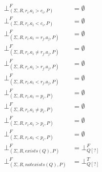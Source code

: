 \begin{mydef}
\begin{align*}
		\bot^F_{(\Sigma,R,r_i.a_i > c_i,P)} & =\emptyset \\
		\bot^F_{(\Sigma,R,r_i.a_i < c_i,P)} & =\emptyset \\
		\bot^F_{(\Sigma,R,r_i.a_i = r_j.a_j,P)} & = \emptyset \\
		\bot^F_{(\Sigma,R,r_i.a_i \neq r_j.a_j,P)} & = \emptyset \\
		\bot^F_{(\Sigma,R,r_i.a_i > r_j.a_j,P)} & = \emptyset \\
		\bot^F_{(\Sigma,R,r_i.a_i < r_j.a_j,P)} & = \emptyset \\
		\bot^F_{(\Sigma,R,r_i.a_i = p_i,P)} & = \emptyset\\
		\bot^F_{(\Sigma,R,r_i.a_i \neq p_i,P)} & = \emptyset \\
		\bot^F_{(\Sigma,R,r_i.a_i > p_i,P)} & = \emptyset\\
		\bot^F_{(\Sigma,R,r_i.a_i < p_i,P)} & = \emptyset\\
		\bot^F_{(\Sigma,R,exists(Q),P)} & = \bot^F_{Q[?]} \\
		\bot^F_{(\Sigma,R,notexists(Q),P)} & = \bot^T_{Q[?]}\\
	\end{align*}
\end{mydef}

